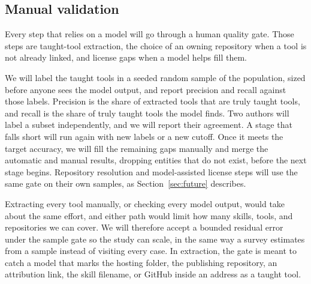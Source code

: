 \subsection{Manual validation}
\label{sec:validation}

Every step that relies on a model will go through a human quality gate.
Those steps are taught-tool extraction, the choice of an owning repository when a tool is not already linked, and license gaps when a model helps fill them.

We will label the taught tools in a seeded random sample of the population, sized before anyone sees the model output, and report precision and recall against those labels.
Precision is the share of extracted tools that are truly taught tools, and recall is the share of truly taught tools the model finds.
Two authors will label a subset independently, and we will report their agreement.
A stage that falls short will run again with new labels or a new cutoff.
Once it meets the target accuracy, we will fill the remaining gaps manually and merge the automatic and manual results, dropping entities that do not exist, before the next stage begins.
Repository resolution and model-assisted license steps will use the same gate on their own samples, as Section~\ref{sec:future} describes.

Extracting every tool manually, or checking every model output, would take about the same effort, and either path would limit how many skills, tools, and repositories we can cover.
We will therefore accept a bounded residual error under the sample gate so the study can scale, in the same way a survey estimates from a sample instead of visiting every case.
In extraction, the gate is meant to catch a model that marks the hosting folder, the publishing repository, an attribution link, the skill filename, or GitHub inside an address as a taught tool.
